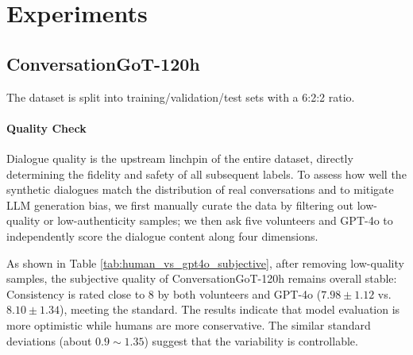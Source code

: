 \section{Experiments}
\subsection{ConversationGoT-120h}
The dataset is split into training/validation/test sets with a 6:2:2 ratio. 
\paragraph{Quality Check}
Dialogue quality is the upstream linchpin of the entire dataset, directly determining the fidelity and safety of all subsequent labels. To assess how well the synthetic dialogues match the distribution of real conversations and to mitigate LLM generation bias, we first manually curate the data by filtering out low-quality or low-authenticity samples; we then ask five volunteers and GPT-4o to independently score the dialogue content along four dimensions.
\begin{table}[t]
\centering
\caption{Subjective comparison between human volunteers and GPT-4o across four conversational quality dimensions.}
\label{tab:human_vs_gpt4o_subjective}
{\fontsize{7}{8.5}\selectfont
\renewcommand{\arraystretch}{0.92}
\setlength{\tabcolsep}{3pt}
}
\end{table}
As shown in Table \ref{tab:human_vs_gpt4o_subjective}, after removing low-quality samples, the subjective quality of ConversationGoT-120h remains overall stable: Consistency is rated close to 8 by both volunteers and GPT-4o ($7.98\pm1.12$ vs. $8.10\pm1.34$), meeting the standard. The results indicate that model evaluation is more optimistic while humans are more conservative. The similar standard deviations (about $0.9\sim1.35$) suggest that the variability is controllable.

